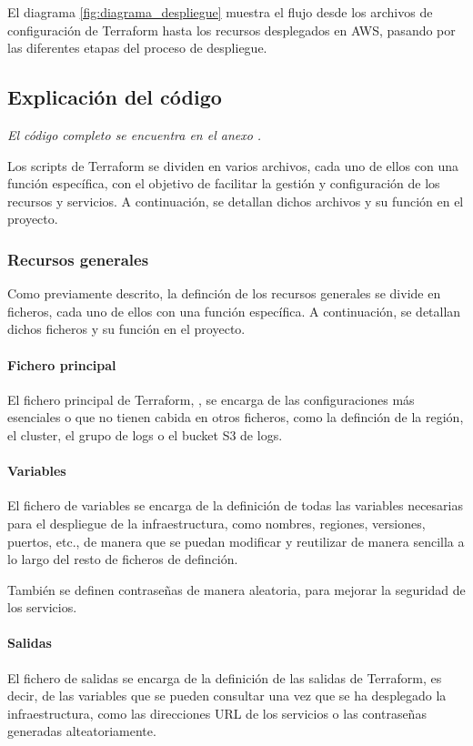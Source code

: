 El diagrama \ref{fig:diagrama_despliegue} muestra el flujo desde los archivos de
configuración de Terraform hasta los recursos desplegados en AWS, pasando por
las diferentes etapas del proceso de despliegue.


\newpage{}
\subsection{Explicación del código}\label{sec:impl_configuracion}
\emph{El código completo se encuentra en el anexo .}

Los scripts de Terraform se dividen en varios archivos, cada uno de ellos con
una función específica, con el objetivo de facilitar la gestión y configuración
de los recursos y servicios. A continuación, se detallan dichos archivos y su
función en el proyecto.


\subsubsection{Recursos generales}
Como previamente descrito, la definción de los recursos generales se divide en
ficheros, cada uno de ellos con una función específica. A continuación, se
detallan dichos ficheros y su función en el proyecto.


\paragraph{Fichero principal}
El fichero principal de Terraform, , se encarga de
las configuraciones más esenciales o que no tienen cabida en otros ficheros,
como la definción de la región, el cluster, el grupo de logs o el bucket S3 de
logs.


\paragraph{Variables}
El fichero de variables 
se encarga de la definición de todas las variables necesarias para el despliegue
de la infraestructura, como nombres, regiones, versiones, puertos, etc., de
manera que se puedan modificar y
reutilizar de manera sencilla a lo largo del resto de ficheros de definción.

También se definen contraseñas de manera aleatoria, para mejorar la seguridad
de los servicios.


\paragraph{Salidas}
El fichero de salidas  se encarga de la
definición de las salidas de Terraform, es decir, de las variables que se pueden
consultar una vez que se ha desplegado la infraestructura, como las direcciones
URL de los servicios o las contraseñas generadas alteatoriamente.

